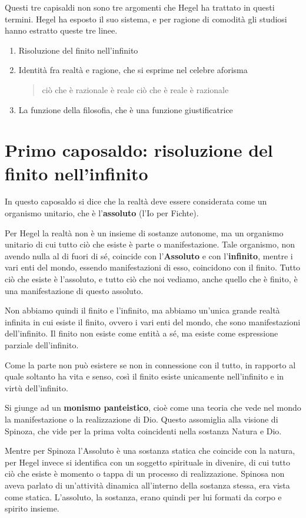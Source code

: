 \documentclass[a4paper, twoside, titlepage]{book}
\newcommand{\citazione}[1]{%
  \begin{quotation}
  #1
  \end{quotation}}
\begin{document}
Questi tre capisaldi non sono tre argomenti che Hegel ha trattato in questi termini. Hegel ha esposto il suo sistema, e per ragione di comodità gli studiosi hanno estratto queste tre linee.
\begin{enumerate}
\item Risoluzione del finito nell'infinito
\item Identità fra realtà e ragione, che si esprime nel celebre aforisma
\citazione{ciò che è razionale è reale ciò che è reale è razionale}
\item La funzione della filosofia, che è una funzione giustificatrice
\end{enumerate}

\section{Primo caposaldo: risoluzione del finito nell'infinito}

In questo caposaldo si dice che la realtà deve essere considerata come un organismo unitario, che è l'\textbf{assoluto} (l'Io per Fichte).

Per Hegel la realtà non è un insieme di sostanze autonome, ma un organismo unitario di cui tutto ciò che esiste è parte o manifestazione. Tale organismo, non avendo nulla al di fuori di sé, coincide con l'\textbf{Assoluto} e con l'\textbf{infinito}, mentre i vari enti del mondo, essendo manifestazioni di esso, coincidono con il finito.
Tutto ciò che esiste è l'assoluto, e tutto ciò che noi vediamo, anche quello che è finito, è una manifestazione di questo assoluto.

Non abbiamo quindi il finito e l'infinito, ma abbiamo un'unica grande realtà infinita in cui esiste il finito, ovvero i vari enti del mondo, che sono manifestazioni dell'infinito.
Il finito non esiste come entità a sé, ma esiste come espressione parziale dell'infinito.

Come la parte non può esistere se non in connessione con il tutto, in rapporto al quale soltanto ha vita e senso, così il finito esiste unicamente nell'infinito e in virtù dell'infinito.

Si giunge ad un \textbf{monismo panteistico}, cioè come una teoria che vede nel mondo la manifestazione o la realizzazione di Dio. Questo assomiglia alla visione di Spinoza, che vide per la prima volta coincidenti nella sostanza Natura e Dio.

Mentre per Spinoza l'Assoluto è una sostanza statica che coincide con la natura, per Hegel invece si identifica con un soggetto spirituale in divenire, di cui tutto ciò che esiste è momento o tappa di un processo di realizzazione.
Spinosa non aveva parlato di un’attività dinamica all’interno della sostanza stessa, era vista come statica. L’assoluto, la sostanza, erano quindi per lui formati da corpo e spirito insieme.
\end{document}
